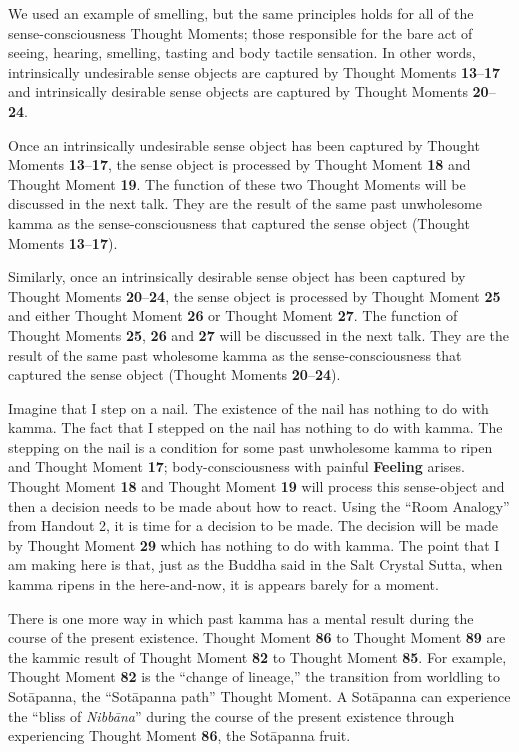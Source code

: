 We used an example of smelling, but the same principles holds for all of the sense-consciousness Thought Moments; those responsible for the bare act of seeing, hearing, smelling, tasting and body tactile sensation. In other words, intrinsically undesirable sense objects are captured by Thought Moments \textbf{13}--\textbf{17} and intrinsically desirable sense objects are captured by Thought Moments \textbf{20}--\textbf{24}.

Once an intrinsically undesirable sense object has been captured by Thought Moments \textbf{13}--\textbf{17}, the sense object is processed by Thought Moment \textbf{18} and Thought Moment \textbf{19}. The function of these two Thought Moments will be discussed in the next talk. They are the result of the same past unwholesome kamma as the sense-consciousness that captured the sense object (Thought Moments \textbf{13}--\textbf{17}).

Similarly, once an intrinsically desirable sense object has been captured by Thought Moments \textbf{20}--\textbf{24}, the sense object is processed by Thought Moment \textbf{25} and either Thought Moment \textbf{26} or Thought Moment \textbf{27}. The function of Thought Moments \textbf{25}, \textbf{26} and \textbf{27} will be discussed in the next talk. They are the result of the same past wholesome kamma as the sense-consciousness that captured the sense object (Thought Moments \textbf{20}--\textbf{24}).

Imagine that I step on a nail. The existence of the nail has nothing to do with kamma. The fact that I stepped on the nail has nothing to do with kamma. The stepping on the nail is a condition for some past unwholesome kamma to ripen and Thought Moment \textbf{17}; body-consciousness with painful \textbf{Feeling} arises. Thought Moment \textbf{18} and Thought Moment \textbf{19} will process this sense-object and then a decision needs to be made about how to react. Using the “Room Analogy” from Handout 2, it is time for a decision to be made. The decision will be made by Thought Moment \textbf{29} which has nothing to do with kamma. The point that I am making here is that, just as the Buddha said in the Salt Crystal Sutta, when kamma ripens in the here-and-now, it is appears barely for a moment.

There is one more way in which past kamma has a mental result during the course of the present existence. Thought Moment \textbf{86} to Thought Moment \textbf{89} are the kammic result of Thought Moment \textbf{82} to Thought Moment \textbf{85}. For example, Thought Moment \textbf{82} is the “change of lineage,” the transition from worldling to Sotāpanna, the “Sotāpanna path” Thought Moment. A Sotāpanna can experience the “bliss of \textit{Nibbāna}” during the course of the present existence through experiencing Thought Moment \textbf{86}, the Sotāpanna fruit.

